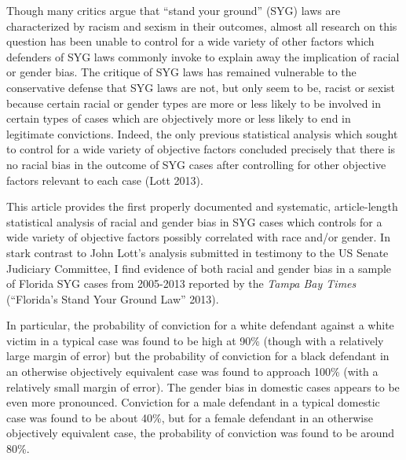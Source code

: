 \documentclass[12pt,article]{article}
\begin{document}
Though many critics argue that ``stand your ground'' (SYG) laws are
characterized by racism and sexism in their outcomes, almost all
research on this question has been unable to control for a wide variety
of other factors which defenders of SYG laws commonly invoke to explain
away the implication of racial or gender bias. The critique of SYG laws
has remained vulnerable to the conservative defense that SYG laws are
not, but only seem to be, racist or sexist because certain racial or
gender types are more or less likely to be involved in certain types of
cases which are objectively more or less likely to end in legitimate
convictions. Indeed, the only previous statistical analysis which sought
to control for a wide variety of objective factors concluded precisely
that there is no racial bias in the outcome of SYG cases after
controlling for other objective factors relevant to each case (Lott
2013).

This article provides the first properly documented and
systematic, article-length statistical analysis of racial and gender
bias in SYG cases which controls for a wide variety of objective factors
possibly correlated with race and/or gender. In stark contrast to John
Lott's analysis submitted in testimony to the US Senate Judiciary
Committee, I find evidence of both racial and gender bias in a sample of
Florida SYG cases from 2005-2013 reported by the \emph{Tampa Bay Times}
(``Florida's Stand Your Ground Law'' 2013).

In particular, the probability of conviction for a white defendant
against a white victim in a typical case was found to be high at 90\%
(though with a relatively large margin of error) but the probability of
conviction for a black defendant in an otherwise objectively equivalent
case was found to approach 100\% (with a relatively small margin of
error). The gender bias in domestic cases appears to be even more
pronounced. Conviction for a male defendant in a typical domestic case
was found to be about 40\%, but for a female defendant in an otherwise
objectively equivalent case, the probability of conviction was found to
be around 80\%.
\end{document}
